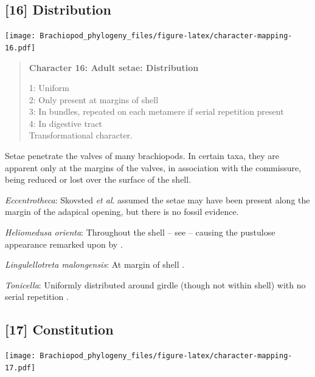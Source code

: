 \documentclass[openany]{book}
\begin{document}
\subsection*{{[}16{]} Distribution}\label{distribution}

\texttt{[image: Brachiopod\_phylogeny\_files/figure-latex/character-mapping-16.pdf]}

\begin{quote}
\textbf{Character 16: Adult setae: Distribution}

1: Uniform\\
2: Only present at margins of shell\\
3: In bundles, repeated on each metamere if serial repetition present\\
4: In digestive tract\\
Transformational character.
\end{quote}

Setae penetrate the valves of many brachiopods. In certain taxa, they
are apparent only at the margins of the valves, in association with the
commissure, being reduced or lost over the surface of the shell.

\hypertarget{Eccentrotheca-coding-16}{}
\emph{Eccentrotheca}: Skovsted \emph{et al}.
\citeyearpar{Skovsted2011Scleritomeconstruction} assumed the setae may
have been present along the margin of the adapical opening, but there is
no fossil evidence.

\hypertarget{Heliomedusa_orienta-coding-16}{}
\emph{Heliomedusa orienta}: Throughout the shell -- see
\citet{Williams2007Supplement} -- causing the pustulose appearance
remarked upon by \citet{Chen2007Reinterpretationof}.

\hypertarget{Lingulellotreta_malongensis-coding-16}{}
\emph{Lingulellotreta malongensis}: At margin of shell
\citep{Zhang2005}.

\hypertarget{Tonicella-coding-16}{}
\emph{Tonicella}: Uniformly distributed around girdle (though not within
shell) with no serial repetition \citep{Vinther2005, Leise1988}.

\subsection*{{[}17{]} Constitution}\label{constitution}

\texttt{[image: Brachiopod\_phylogeny\_files/figure-latex/character-mapping-17.pdf]}
\end{document}
